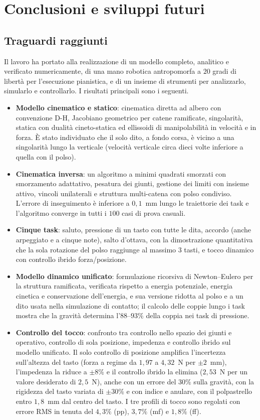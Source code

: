 \chapter{Conclusioni e sviluppi futuri}
\label{ch:conclusioni}

\section{Traguardi raggiunti}

Il lavoro ha portato alla realizzazione di un modello completo, analitico e verificato numericamente, di una mano robotica antropomorfa a $20$ gradi di libertà per l'esecuzione pianistica, e di un insieme di strumenti per analizzarlo, simularlo e controllarlo. I risultati principali sono i seguenti.
\begin{itemize}
    \item \textbf{Modello cinematico e statico}: cinematica diretta ad albero con convenzione D-H, Jacobiano geometrico per catene ramificate, singolarità, statica con dualità cineto-statica ed ellissoidi di manipolabilità in velocità e in forza. È stato individuato che il solo dito, a fondo corsa, è vicino a una singolarità lungo la verticale (velocità verticale circa dieci volte inferiore a quella con il polso).
    \item \textbf{Cinematica inversa}: un algoritmo a minimi quadrati smorzati con smorzamento adattativo, pesatura dei giunti, gestione dei limiti con insieme attivo, vincoli unilaterali e struttura multi-catena con polso condiviso. L'errore di inseguimento è inferiore a $0{,}1$~mm lungo le traiettorie dei task e l'algoritmo converge in tutti i $100$ casi di prova casuali.
    \item \textbf{Cinque task}: saluto, pressione di un tasto con tutte le dita, accordo (anche arpeggiato e a cinque note), salto d'ottava, con la dimostrazione quantitativa che la sola rotazione del polso raggiunge al massimo $3$ tasti, e tocco dinamico con controllo ibrido forza/posizione.
    \item \textbf{Modello dinamico unificato}: formulazione ricorsiva di Newton--Eulero per la struttura ramificata, verificata rispetto a energia potenziale, energia cinetica e conservazione dell'energia, e sua versione ridotta al polso e a un dito usata nella simulazione di contatto; il calcolo delle coppie lungo i task mostra che la gravità determina l'$88$--$93\%$ della coppia nei task di pressione.
    \item \textbf{Controllo del tocco}: confronto tra controllo nello spazio dei giunti e operativo, controllo di sola posizione, impedenza e controllo ibrido sul modello unificato. Il solo controllo di posizione amplifica l'incertezza sull'altezza del tasto (forza a regime da $1{,}97$ a $4{,}32$~N per $\pm2$~mm), l'impedenza la riduce a $\pm8\%$ e il controllo ibrido la elimina ($2{,}53$~N per un valore desiderato di $2{,}5$~N), anche con un errore del $30\%$ sulla gravità, con la rigidezza del tasto variata di $\pm30\%$ e con indice e anulare, con il polpastrello entro $1{,}8$~mm dal centro del tasto. I tre profili di tocco sono regolati con errore RMS in tenuta del $4{,}3\%$ (pp), $3{,}7\%$ (mf) e $1{,}8\%$ (ff).

\end{itemize}
